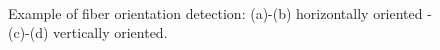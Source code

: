 \begin{figure}
  \centering

  \hspace*{\fill}
   \hfill
  \hspace*{\fill} \\ \hspace*{\fill}
   \hfill
  \hspace*{\fill}
	
	\caption{Example of fiber orientation detection: (a)-(b) horizontally oriented - (c)-(d)
		vertically oriented.}
		\label{fig:10}
		\end{figure}
